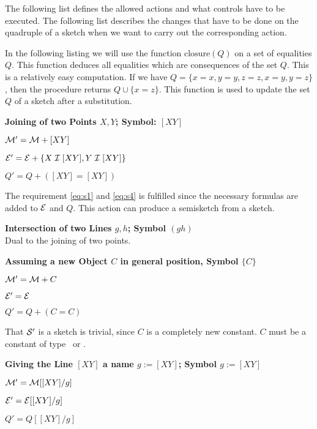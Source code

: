 The following list defines the allowed actions and what controls have
to be executed.
The following list describes the changes that have to be done on the
quadruple of a sketch when we want to carry out the corresponding
action. 

In the following listing we will use the function $\text{closure}(Q)$
on a set of equalities $Q$. This function deduces all equalities which
are consequences of the set $Q$. This is a relatively easy
computation. If we have $Q=\{x=x,y=y,z=z,x=y,y=z\}$, then the
procedure returns $Q\cup\{x=z\}$. This function is used to update the
set $Q$ of a sketch after a substitution.

\begin{description}
\item\textbf{Joining of two Points $X,Y$; Symbol: $[XY]$}
        \begin{compactitem}
        \item $\cM'=\cM+[XY]$
        \item $\cE'=\cE+\{X\cI[XY], Y\cI[XY]\}$
        \item $Q'=Q+([XY]=[XY])$
        \end{compactitem}
        The requirement \eqref{eq:s1} and \eqref{eq:s4} is fulfilled
        since the necessary formulas are added to $\cE$ and
        $Q$. This action can produce a semisketch from a sketch.
\item\textbf{Intersection of two Lines $g,h$; Symbol $(gh)$}\\
        Dual to the joining of two points.
\item\textbf{Assuming a  new Object $C$ in general position, Symbol $\{C\}$}
        \begin{compactitem}
        \item $\cM'=\cM+C$
        \item $\cE'=\cE$
        \item $Q'=Q+(C=C)$
        \end{compactitem}
        That $\cS'$ is a sketch is trivial, since $C$ is a completely
        new constant. $C$ must be a constant of type \ttyppo\ or
        \ttypli.
\item\textbf{Giving the Line $[XY]$ a name $g:=[XY]$; Symbol $g:=[XY]$}
        \begin{compactitem}
        \item $\cM'=\cM[[XY]/g]$
        \item $\cE'=\cE[[XY]/g]$
        \item $Q'=Q[[XY]/g]$
        \end{compactitem}

\end{description}
